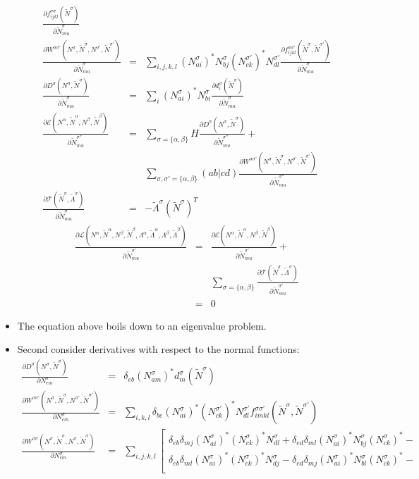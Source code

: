 \documentclass[aip,graphicx]{revtex4-1}
\newcommand{\nNq}[1]{N^{#1}}
\newcommand{\nNa}{\nNq{\alpha}}
\newcommand{\nNb}{\nNq{\beta}}
\newcommand{\nNs}{\nNq{\sigma}}
\newcommand{\nNt}{\nNq{\sigma'}}
\newcommand{\nNsd}[1]{\left(\nNq{\sigma}_{#1}\right)^{*}}
\newcommand{\nNtd}[1]{\left(\nNq{\sigma'}_{#1}\right)^{*}}
\newcommand{\tNq}[1]{\tilde{N}^{#1}}
\newcommand{\tNa}{\tNq{\alpha}}
\newcommand{\tNb}{\tNq{\beta}}
\newcommand{\tNs}{\tNq{\sigma}}
\newcommand{\tNt}{\tNq{\sigma'}}
\newcommand{\tNu}{\tNq{\sigma''}}
\newcommand{\dq}[2]{d_{#1}^{#2}}
\newcommand{\ds}[1]{\dq{#1}{\sigma}}
\newcommand{\Dq}[1]{D^{#1}}
\newcommand{\Ds}{\Dq{\sigma}}
\newcommand{\Wqq}[2]{W^{#1 #2}}
\newcommand{\Wss}{\Wqq{\sigma}{\sigma}}
\newcommand{\Wst}{\Wqq{\sigma}{\sigma'}}
\newcommand{\nLq}[1]{\Lambda^{#1}}
\newcommand{\nLa}{\nLq{\alpha}}
\newcommand{\nLb}{\nLq{\beta}}
\newcommand{\tLq}[1]{\tilde{\Lambda}^{#1}}
\newcommand{\tLa}{\tLq{\alpha}}
\newcommand{\tLb}{\tLq{\beta}}
\newcommand{\tLs}{\tLq{\sigma}}
\begin{document}
\begin{itemize}
\begin{eqnarray}
      \frac{\partial f^{\sigma\sigma}_{ijkl}(\tNs)}{\partial\tNs_{mu}} \\
      \frac{\partial \Wst(\nNs,\tNs,\nNt,\tNt)}{\partial\tNs_{mu}} &=& \sum_{i,j,k,l}\nNsd{ai}\nNs_{bj}\nNtd{ck}\nNt_{dl}
      \frac{\partial f^{\sigma\sigma'}_{ijkl}(\tNs,\tNt)}{\partial\tNs_{mu}} \\
      \frac{\partial\Ds(\nNs,\tNs)}{\partial\tNs_{mu}}
      &=& \sum_i \nNsd{ai} \nNs_{bi} 
      \frac{\partial\ds{i}(\tNs)}{\partial\tNs_{mu}} \\
      \frac{\partial\mathcal{E}(\nNa,\tNa,\nNb,\tNb)}{\partial\tNu_{mu}}
      &=& \sum_{\sigma=\{\alpha,\beta\}}H
          \frac{\partial\Ds(\nNs,\tNs)}{\partial\tNu_{mu}} + \nonumber\\
      &&  \sum_{\sigma,\sigma'=\{\alpha,\beta\}}(ab|cd)
          \frac{\partial\Wst(\nNs,\tNs,\nNt,\tNt)}{\partial\tNu_{mu}} \\
      \frac{\partial\mathcal{T}(\tNs,\tLs)}{\partial\tNs_{mu}}
      &=& -\tLs\left(\tNs\right)^T 
      \end{eqnarray}
      \begin{eqnarray}
      \frac{\partial\mathcal{L}(\nNa,\tNa,\nNb,\tNb,\nLa,\tLa,\nLb,\tLb)}{\partial\tNt_{mu}} &=& 
      \frac{\partial\mathcal{E}(\nNa,\tNa,\nNb,\tNb)}{\partial\tNt_{mu}} + \nonumber\\
      && \sum_{\sigma=\{\alpha,\beta\}}\frac{\partial\mathcal{T}(\tNs,\tLs)}{\partial\tNt_{mu}} \\
      &=& 0
      \end{eqnarray}
\item The equation above boils down to an eigenvalue problem.
\item Second consider derivatives with respect to the normal functions:
      \begin{eqnarray}
      \frac{\partial\Ds(\nNs,\tNs)}{\partial\nNs_{em}} &=& \delta_{eb}\nNsd{am} \ds{m}(\tNs) \\
      \frac{\partial\Wst(\nNs,\tNs,\nNt,\tNt)}{\partial\nNs_{em}} &=& \sum_{i,k,l}\delta_{be}\nNsd{ai}\nNtd{ck}\nNt_{dl}f^{\sigma\sigma'}_{imkl}(\tNs,\tNt) \\
      \frac{\partial\Wss(\nNs,\tNs,\nNs,\tNs)}{\partial\nNs_{em}} &=&
      \sum_{i,j,k,l} \left[\begin{array}{c}
      \delta_{eb}\delta_{mj}\nNsd{ai}\nNsd{ck}\nNs_{dl} + \delta_{ed}\delta_{ml}\nNsd{ai}\nNs_{bj}\nNsd{ck} - \\
      \delta_{eb}\delta_{ml}\nNsd{ai}\nNsd{ck}\nNs_{dj} - \delta_{ed}\delta_{mj}\nNsd{ai}\nNs_{bl}\nNsd{ck} - \\

\end{array}
\end{eqnarray}
\end{itemize}
\end{document}
